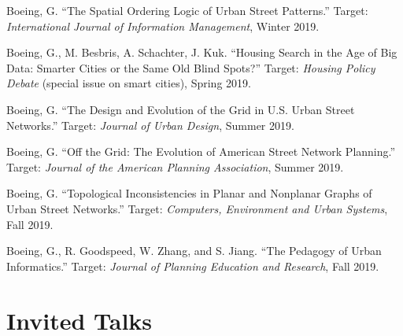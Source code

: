 \documentclass[12pt,letterpaper]{report}
\begin{document}
	\begin{tablist}
				
		\item[\the\year] \tab Boeing, G. \enquote{The Spatial Ordering Logic of Urban Street Patterns.} Target: \textit{International Journal of Information Management}, Winter 2019.
		
		\item[\the\year] \tab Boeing, G., M. Besbris, A. Schachter, J. Kuk. \enquote{Housing Search in the Age of Big Data: Smarter Cities or the Same Old Blind Spots?} Target: \textit{Housing Policy Debate} (special issue on smart cities), Spring 2019.
		
		\item[\the\year] \tab Boeing, G. \enquote{The Design and Evolution of the Grid in U.S. Urban Street Networks.} Target: \textit{Journal of Urban Design}, Summer 2019.
		
		\item[\the\year] \tab Boeing, G. \enquote{Off the Grid: The Evolution of American Street Network Planning.} Target: \textit{Journal of the American Planning Association}, Summer 2019.
		
		\item[\the\year] \tab Boeing, G. \enquote{Topological Inconsistencies in Planar and Nonplanar Graphs of Urban Street Networks.} Target: \textit{Computers, Environment and Urban Systems}, Fall 2019.
		
		\item[\the\year] \tab Boeing, G., R. Goodspeed, W. Zhang, and S. Jiang. \enquote{The Pedagogy of Urban Informatics.} Target: \textit{Journal of Planning Education and Research}, Fall 2019.
		
	\end{tablist}
	
	
	
	\section*{Invited Talks}
	
\end{document}
